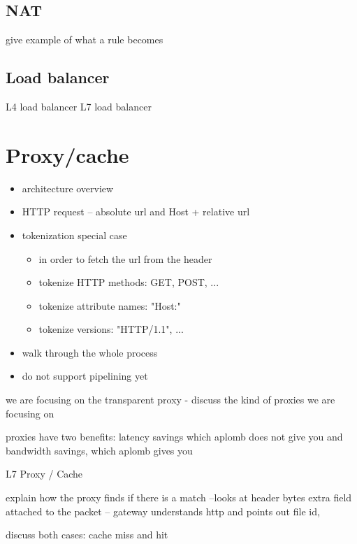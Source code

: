 \subsection{NAT}\label{sec:nat}

give example of what a rule becomes

\subsection{Load balancer}\label{sec:loadb}

L4 load balancer
L7 load balancer





\section{Proxy/cache}\label{sec:proxy}
\begin{itemize}
\item architecture overview
\item HTTP request -- absolute url and Host + relative url
\item tokenization special case \\
    \begin{itemize}
    \item in order to fetch the url from the header
    \item tokenize HTTP methods: GET, POST, ...
    \item tokenize attribute names: "Host:"
    \item tokenize versions: "HTTP/1.1", ...
    \end{itemize}
\item walk through the whole process
\item do not support pipelining yet
\end{itemize}


we are focusing on the transparent proxy
- discuss the kind of proxies we are focusing on

proxies have two benefits: latency savings which aplomb does not give you 
and bandwidth savings, which aplomb gives you
 
L7 Proxy / Cache

explain how the proxy finds if there is  a match --looks at header bytes
extra field attached to the packet -- gateway understands http and points out file id, 

discuss both cases: cache miss and hit

